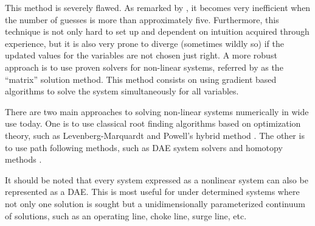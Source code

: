 This method is severely flawed. As remarked by \textcite{walsh2004gas}, it becomes very inefficient when the number of guesses is more than approximately five. Furthermore, this technique is not only hard to set up and dependent on intuition acquired through experience, but it is also very prone to diverge (sometimes wildly so) if the updated values for the variables are not chosen just right. A more robust approach is to use proven solvers for non-linear systems, referred by \textcite{walsh2004gas} as the ``matrix'' solution method. 
This method consists on using gradient based algorithms to solve the system simultaneously for all variables.

There are two main approaches to solving non-linear systems numerically in wide use today. 
One is to use classical root finding algorithms based on optimization theory, such as Levenberg-Marquardt and Powell's hybrid method \cite{minpack}.
The other is to use path following methods, such as
\ac{DAE} system solvers and homotopy methods \cite{Allgower1997,Rabier2002,hompack,sundials}. 

It should be noted that every system expressed as a nonlinear system can also be represented as a \ac{DAE}. 
This is most useful for under determined systems where not only one solution is sought 
but a unidimensionally parameterized continuum of solutions, such as an operating line, 
choke line, surge line, etc.

